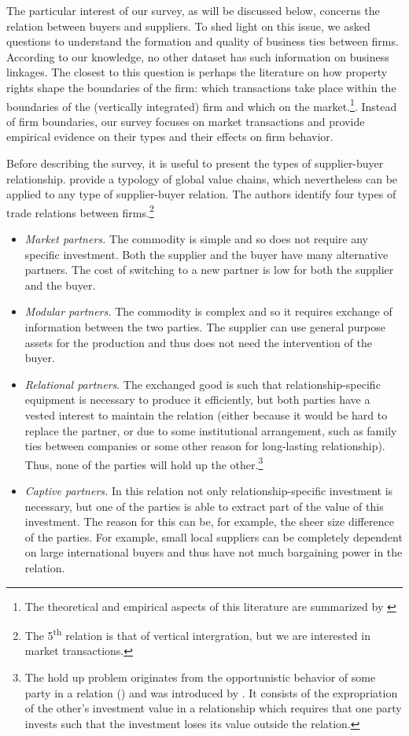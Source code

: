 \documentclass[final, dvipsnames, authoryear,12pt]{elsarticle}
\begin{document}
The particular interest of our survey, as will be discussed below, concerns the relation between buyers and suppliers. To shed light on this issue, we asked questions to understand the formation and quality of business ties between firms. According to our knowledge, no other dataset has such information on business linkages. The closest to this question is perhaps the literature on how property rights shape the boundaries of the firm: which transactions take place within the boundaries of the (vertically integrated) firm and which on the market.\footnote{The theoretical and empirical aspects of this literature are summarized by \cite{antras2013grossman}}. Instead of firm boundaries, our survey focuses on market transactions and provide empirical evidence on their types and their effects on firm behavior.

Before describing the survey, it is useful to present the types of supplier-buyer relationship. \cite{gereffi2005governance} provide a typology of global value chains, which nevertheless can be applied to any type of supplier-buyer relation. The authors identify four types of trade relations between firms.\footnote{The 5\textsuperscript{th} relation is that of vertical intergration, but we are interested in market transactions.}

\begin{itemize}
    \item \emph{Market partners.} The commodity is simple and so does not require any specific investment. Both the supplier and the buyer have many alternative partners. The cost of switching to a new partner is low for both the supplier and the buyer.
    \item \emph{Modular partners.} The commodity is complex and so it requires exchange of information between the two parties. The supplier can use general purpose assets for the production and thus does not need the intervention of the buyer.
    \item \emph{Relational partners}. The exchanged good is such that relationship-specific equipment is necessary to produce it efficiently, but both parties have a vested interest to maintain the relation (either because it would be hard to replace the partner, or due to some institutional arrangement, such as family ties between companies or some other reason for long-lasting relationship). Thus, none of the parties will hold up the other.\footnote{The hold up problem originates from the opportunistic behavior of some party in a relation (\cite{williamson2007economic}) and was introduced by \cite{grossman1986costs}. It consists of the expropriation of the other's investment value in a relationship which requires that one party invests such that the investment loses its value outside the relation.}
    \item \emph{Captive partners.} In this relation not only relationship-specific investment is necessary, but one of the parties is able to extract part of the value of this investment. The reason for this can be, for example, the sheer size difference of the parties. For example, small local suppliers can be completely dependent on large international buyers and thus have not much bargaining power in the relation.
\end{itemize}
\end{document}
